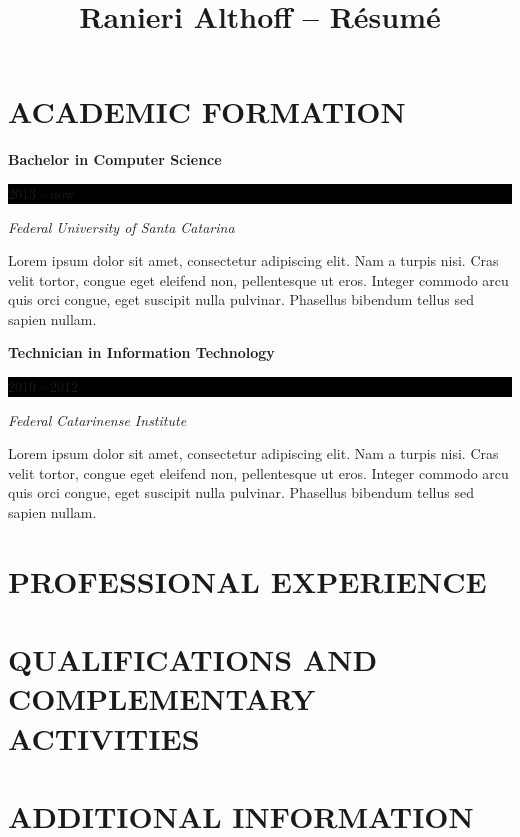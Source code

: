 \documentclass[10pt]{article}
\newcommand{\sectiontitle}[1]{\section*{\uppercase{#1}}}
\begin{document}
 \selectfont

\title{Ranieri Althoff -- Résumé}

\sectiontitle{Academic Formation}
\noindent \textbf{Bachelor in Computer Science} \hfill
\colorbox{black}{
	\parbox{8em}{
		\hfill \color{white} 2013 - now
	}
} \par
\noindent \textit{Federal University of Santa Catarina} \par
\noindent \small Lorem ipsum dolor sit amet, consectetur adipiscing elit. Nam a turpis
	nisi. Cras velit tortor, congue eget eleifend non, pellentesque ut eros.
	Integer commodo arcu quis orci congue, eget suscipit nulla pulvinar.
	Phasellus bibendum tellus sed sapien nullam. \par
\normalsize
\vspace{1em}

\noindent \textbf{Technician in Information Technology} \hfill
\colorbox{black}{
	\parbox{8em}{
		\hfill \color{white} 2010 - 2012
	}
} \par
\noindent \textit{Federal Catarinense Institute} \par
\noindent \small Lorem ipsum dolor sit amet, consectetur adipiscing elit. Nam a turpis
	nisi. Cras velit tortor, congue eget eleifend non, pellentesque ut eros.
	Integer commodo arcu quis orci congue, eget suscipit nulla pulvinar.
	Phasellus bibendum tellus sed sapien nullam. \par
\normalsize
\vspace{1em}


\sectiontitle{Professional Experience}


\sectiontitle{Qualifications and Complementary Activities}


\sectiontitle{Additional Information}
\end{document}
